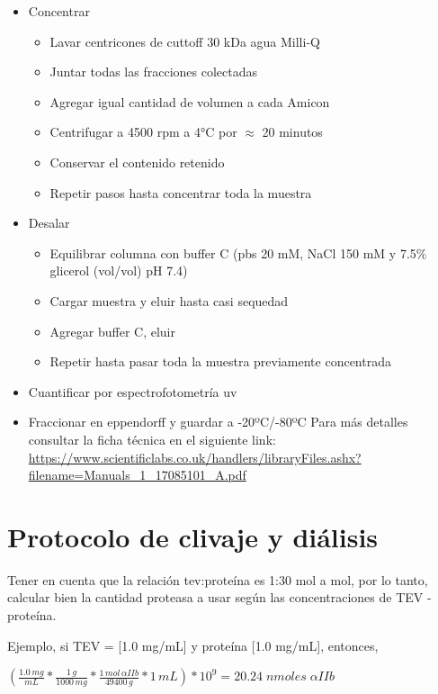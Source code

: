 \begin{appendix}
\begin{itemize}
    \item{Concentrar}
     \begin{itemize}
        \item{Lavar centricones de cuttoff 30 kDa agua Milli-Q}
        \item{Juntar todas las fracciones colectadas}
        \item{Agregar igual cantidad de volumen a cada Amicon}
        \item{Centrifugar a 4500 \ac{rpm} a 4°C por $\approx$ 20 minutos}
        \item{Conservar el contenido retenido}
        \item{Repetir pasos hasta concentrar toda la muestra}
    \end{itemize}

    \item{Desalar}
     \begin{itemize}
        \item{Equilibrar columna con buffer C (\ac{pbs} 20 mM, NaCl 150 mM y 7.5$\%$ glicerol (vol/vol) pH 7.4)}
        \item{Cargar muestra y eluir hasta casi sequedad}
        \item{Agregar buffer C, eluir}
        \item{Repetir hasta pasar toda la muestra previamente concentrada}
    \end{itemize}
    \item{Cuantificar por  espectrofotometría \ac{uv}}
    \item{Fraccionar en eppendorff y guardar a -20ºC/-80ºC}
Para más detalles consultar la ficha técnica en el siguiente link:  \url{https://www.scientificlabs.co.uk/handlers/libraryFiles.ashx?filename=Manuals_1_17085101_A.pdf}
\end{itemize}

\section{Protocolo de clivaje y diálisis}\label{Protocolo_TEV}

Tener en cuenta que la relación \ac{tev}:proteína es 1:30 mol a mol, por lo tanto, calcular bien la cantidad proteasa a usar según las concentraciones de TEV - proteína.

Ejemplo, si TEV = [1.0 mg/mL] y proteína [1.0 mg/mL], entonces,

$
\left( \frac{1.0 \, mg}{mL}*\frac{1 \,  g}{1000 \, mg}*\frac{1\,  mol\,  \alpha IIb}{49400\,  g}*1 \, mL \right)*10^9= 20.24 \;nmoles \;  \alpha IIb
$



\end{appendix}
